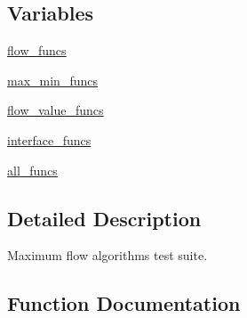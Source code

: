 \subsection*{Variables}
\begin{DoxyCompactItemize}
\item 
\hyperlink{namespacenetworkx_1_1algorithms_1_1flow_1_1tests_1_1test__maxflow_abb13c2380ceef42b60fa8d2ebf37b032}{flow\+\_\+funcs}
\item 
\hyperlink{namespacenetworkx_1_1algorithms_1_1flow_1_1tests_1_1test__maxflow_a74c4b8d7b404212fe185ddcb4d46c310}{max\+\_\+min\+\_\+funcs}
\item 
\hyperlink{namespacenetworkx_1_1algorithms_1_1flow_1_1tests_1_1test__maxflow_ab0276f9b92a6a10ed658d8ccdba8e0ae}{flow\+\_\+value\+\_\+funcs}
\item 
\hyperlink{namespacenetworkx_1_1algorithms_1_1flow_1_1tests_1_1test__maxflow_aeb024362830495ed14928aaafb35464b}{interface\+\_\+funcs}
\item 
\hyperlink{namespacenetworkx_1_1algorithms_1_1flow_1_1tests_1_1test__maxflow_a76755b9a63efd0d86e6b9bf8096fef5a}{all\+\_\+funcs}
\end{DoxyCompactItemize}


\subsection{Detailed Description}
\begin{DoxyVerb}Maximum flow algorithms test suite.
\end{DoxyVerb}
 

\subsection{Function Documentation}
\mbox{\label{namespacenetworkx_1_1algorithms_1_1flow_1_1tests_1_1test__maxflow_a466ff856a4ac0918bc79cb752539fb7d}} 
